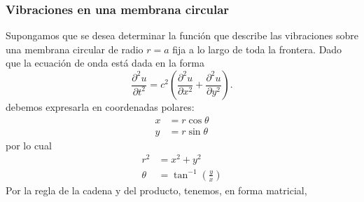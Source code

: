 \documentclass[11pt,letterpaper]{report}
\newcommand\<{\langle}
\renewcommand\>{\rangle}
\begin{document}
\subsubsection{Vibraciones en una membrana circular}
Supongamos que se desea determinar la función que describe las
vibraciones sobre una membrana circular de radio $r=a$ fija a lo largo
de toda la frontera.
Dado que la ecuación de onda está dada en la forma
\[
  \frac{\partial^{2} u}{\partial t^{2}}
  = c^{2} \left(
    \frac{\partial ^{2}u}{\partial x^{2}}
    +\frac{\partial ^{2}u}{\partial y^{2}}
  \right)
.\]
debemos expresarla en coordenadas polares:
\begin{align*}
  x &= r\cos\theta \\
  y &= r\sin\theta
\end{align*}
por lo cual
\begin{align*}
  r^2 &= x^{2}+y^{2} \\
  \theta &= \tan^{-1}(\tfrac{y}{x})
\end{align*}
Por la regla de la cadena y del producto, tenemos, en forma matricial,
\end{document}
